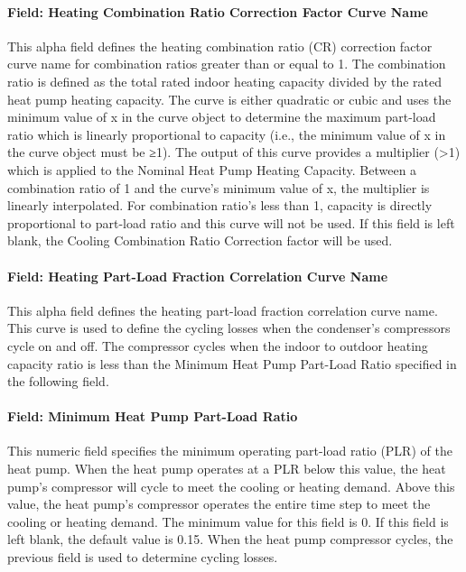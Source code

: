\paragraph{Field: Heating Combination Ratio Correction Factor Curve Name}\label{field-heating-combination-ratio-correction-factor-curve-name}

This alpha field defines the heating combination ratio (CR) correction factor curve name for combination ratios greater than or equal to 1. The combination ratio is defined as the total rated indoor heating capacity divided by the rated heat pump heating capacity. The curve is either quadratic or cubic and uses the minimum value of x in the curve object to determine the maximum part-load ratio which is linearly proportional to capacity (i.e., the minimum value of x in the curve object must be ≥1). The output of this curve provides a multiplier (\textgreater{}1) which is applied to the Nominal Heat Pump Heating Capacity. Between a combination ratio of 1 and the curve's minimum value of x, the multiplier is linearly interpolated. For combination ratio's less than 1, capacity is directly proportional to part-load ratio and this curve will not be used. If this field is left blank, the Cooling Combination Ratio Correction factor will be used.

\paragraph{Field: Heating Part-Load Fraction Correlation Curve Name}\label{field-heating-part-load-fraction-correlation-curve-name}

This alpha field defines the heating part-load fraction correlation curve name. This curve is used to define the cycling losses when the condenser's compressors cycle on and off. The compressor cycles when the indoor to outdoor heating capacity ratio is less than the Minimum Heat Pump Part-Load Ratio specified in the following field.

\paragraph{Field: Minimum Heat Pump Part-Load Ratio}\label{field-minimum-heat-pump-part-load-ratio-000}

This numeric field specifies the minimum operating part-load ratio (PLR) of the heat pump. When the heat pump operates at a PLR below this value, the heat pump's compressor will cycle to meet the cooling or heating demand. Above this value, the heat pump's compressor operates the entire time step to meet the cooling or heating demand. The minimum value for this field is 0. If this field is left blank, the default value is 0.15. When the heat pump compressor cycles, the previous field is used to determine cycling losses.

